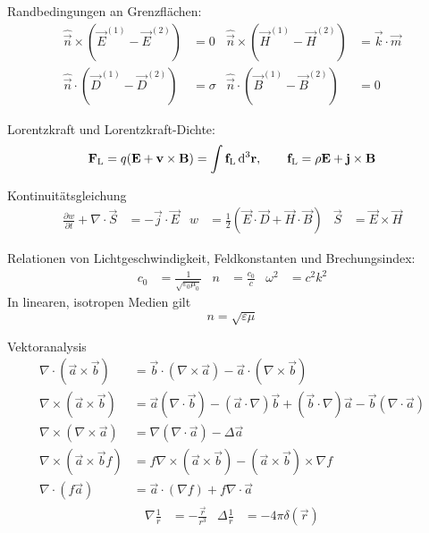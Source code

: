 Randbedingungen an Grenzflächen:
\begin{align*}
	\hat{\vec n}\times(\vec E^{(1)}-\vec E^{(2)}) & = 0      & \hat{\vec n}\times(\vec H^{(1)}-\vec H^{(2)}) & = \vec k\cdot \vec m \\
	\hat{\vec n}\cdot(\vec D^{(1)}-\vec D^{(2)})  & = \sigma & \hat{\vec n}\cdot(\vec B^{(1)}-\vec B^{(2)})  & = 0
\end{align*}

Lorentzkraft und Lorentzkraft-Dichte:
\begin{align*}
	\vec F_\text{L} = q(\vec E+\vec v\times \vec B) = \int \vec f_\text{L}\diffa[3]{\vec r}, \qquad \vec f_\text{L}=\rho\vec E+\vec j\times \vec B
\end{align*}

Kontinuitätsgleichung
\begin{align*}
	\frac{\partial w}{\partial t}+\nabla\cdot \vec S & = -\vec j\cdot \vec E & w & =\frac{1}{2}\left(\vec E\cdot \vec D+\vec H\cdot \vec B\right) &
	\vec S                                           & =\vec E\times \vec H
\end{align*}

Relationen von Lichtgeschwindigkeit, Feldkonstanten und Brechungsindex:
\begin{align*}
	c_{0} & =\frac{1}{\sqrt{\varepsilon _{0}\mu _{0}}} & n & =\frac{c_{0}}{c} & \omega^2 & =c^2 k^2
\end{align*}
In linearen, isotropen Medien gilt
\begin{equation*}
	n=\sqrt{\varepsilon\mu}
\end{equation*}

Vektoranalysis
\begin{align*}
	\nabla\cdot (\vec a\times \vec b)   & =\vec b\cdot(\nabla\times\vec a)-\vec a\cdot(\nabla\times\vec b)                                             \\
	\nabla\times (\vec a\times  \vec b) & =\vec a(\nabla\cdot \vec b)-(\vec a\cdot \nabla)\vec b+(\vec b\cdot \nabla)\vec a-\vec b(\nabla\cdot \vec a) \\
	\nabla \times (\nabla\times \vec a) & =\nabla(\nabla\cdot \vec a) - \Delta\vec a                                                                   \\
	\nabla\times(\vec a\times \vec b f) & = f\nabla\times(\vec a\times  \vec b)-(\vec a\times  \vec b)\times \nabla f                                  \\
	\nabla\cdot(f\vec a)                & = \vec a\cdot (\nabla f)+f\nabla \cdot \vec a
\end{align*}
\begin{align*}
	\nabla \frac{1}{r} & =-\frac{\vec {r}}{r^{3}} & \Delta \frac{1}{r} & =-4\pi\delta(\vec r)
\end{align*}

